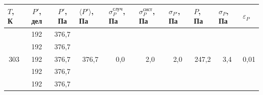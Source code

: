\documentclass[a4paper,12pt]{article}
\begin{document}
\begin{table}[H]
\begin{tabular}{|c|c|c|c|c|c|c|c|c|c|}
\hline
\multicolumn{1}{|l|}{$ T $, К} & $ P' $, дел & $ P' $, Па & \multicolumn{1}{l|}{$ \langle P' \rangle $, Па} & \multicolumn{1}{l|}{$\sigma_P^{случ}$, Па} & \multicolumn{1}{l|}{$\sigma_P^{сист}$, Па} & \multicolumn{1}{l|}{$ \sigma_{P'} $, Па} & \multicolumn{1}{l|}{$ P $, Па} & \multicolumn{1}{l|}{$ \sigma_P $, Па} & \multicolumn{1}{l|}{$\varepsilon_P$} \\ \hline
\multirow{5}{*}{303}           & 192         & 376,7      & \multirow{5}{*}{376,7}                          & \multirow{5}{*}{0,0}                       & \multirow{5}{*}{2,0}                       & \multirow{5}{*}{2,0}                     & \multirow{5}{*}{247,2}         & \multirow{5}{*}{3,4}                  & \multirow{5}{*}{0,01}                \\ \cline{2-3}
                               & 192         & 376,7      &                                                 &                                            &                                            &                                          &                                &                                       &                                      \\ \cline{2-3}
                               & 192         & 376,7      &                                                 &                                            &                                            &                                          &                                &                                       &                                      \\ \cline{2-3}
                               & 192         & 376,7      &                                                 &                                            &                                            &                                          &                                &                                       &                                      \\ \cline{2-3}
                               & 192         & 376,7      &                                                 &                                            &                                            &                                          &                                &                                       &                                      \\ \hline
\end{tabular}
\end{table}
\end{document}

